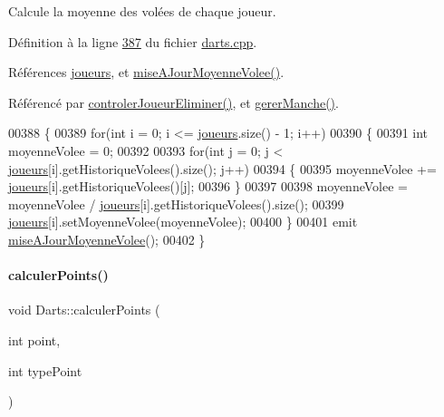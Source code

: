 Calcule la moyenne des volées de chaque joueur. 



Définition à la ligne \hyperlink{darts_8cpp_source_l00387}{387} du fichier \hyperlink{darts_8cpp_source}{darts.\+cpp}.



Références \hyperlink{darts_8h_source_l00073}{joueurs}, et \hyperlink{class_darts_a70c1ccef5cb7e47bff1384041ad9a596}{mise\+A\+Jour\+Moyenne\+Volee()}.



Référencé par \hyperlink{darts_8cpp_source_l00349}{controler\+Joueur\+Eliminer()}, et \hyperlink{darts_8cpp_source_l00303}{gerer\+Manche()}.


\begin{DoxyCode}
00388 \{
00389     \textcolor{keywordflow}{for}(\textcolor{keywordtype}{int} i = 0; i <= \hyperlink{class_darts_a81bc116f3ae70cea1f492f87f01901c7}{joueurs}.size() - 1; i++)
00390     \{
00391         \textcolor{keywordtype}{int} moyenneVolee = 0;
00392 
00393         \textcolor{keywordflow}{for}(\textcolor{keywordtype}{int} j = 0; j < \hyperlink{class_darts_a81bc116f3ae70cea1f492f87f01901c7}{joueurs}[i].getHistoriqueVolees().size(); j++)
00394         \{
00395             moyenneVolee += \hyperlink{class_darts_a81bc116f3ae70cea1f492f87f01901c7}{joueurs}[i].getHistoriqueVolees()[j];
00396         \}
00397 
00398         moyenneVolee = moyenneVolee / \hyperlink{class_darts_a81bc116f3ae70cea1f492f87f01901c7}{joueurs}[i].getHistoriqueVolees().size();
00399         \hyperlink{class_darts_a81bc116f3ae70cea1f492f87f01901c7}{joueurs}[i].setMoyenneVolee(moyenneVolee);
00400     \}
00401     emit \hyperlink{class_darts_a70c1ccef5cb7e47bff1384041ad9a596}{miseAJourMoyenneVolee}();
00402 \}
\end{DoxyCode}
\mbox{\label{class_darts_a6a6c58dee559e851709d76fef9a8c6da}} 
\paragraph{\texorpdfstring{calculer\+Points()}{calculerPoints()}}
{\footnotesize\ttfamily void Darts\+::calculer\+Points (\begin{DoxyParamCaption}\item[{int}]{point,  }\item[{int}]{type\+Point }\end{DoxyParamCaption})\hspace{0.3cm}{\ttfamily [private]}}



